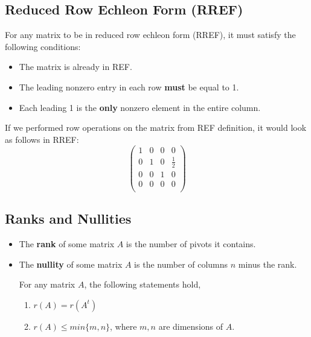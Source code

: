 \documentclass[a4paper]{article}
\begin{document}
  \subsection{Reduced Row Echleon Form (RREF)}\label{rref}
  For any matrix to be in reduced row echleon form (RREF), it must satisfy the following conditions:
  \begin{itemize}
    \item The matrix is already in REF.
    \item The leading nonzero entry in each row \textbf{must} be equal to 1.
    \item Each leading 1 is the \textbf{only} nonzero element in the entire column.
  \end{itemize}
  If we performed row operations on the matrix from REF definition, it would look as follows in RREF:
  \[
    \begin{pmatrix}
      1 & 0 & 0 & 0 \\  
      0 & 1 & 0 & \frac{1 }{2} \\  
      0 & 0 & 1 & 0 \\  
      0 & 0 & 0 & 0 \\  
    \end{pmatrix}
  \]
  \subsection{Ranks and Nullities}
  \begin{itemize}
    \item The \textbf{rank} of some matrix $A$ is the number of pivots it contains.
    \item The \textbf{nullity} of some matrix $A$ is the number of columns $n$ minus the rank.
  \begin{theorem}
    For any matrix $A$, the following statements hold,
    \begin{enumerate}
      \item $r(A) = r(A^t)$
      \item $r(A) \le min\{m,n\}$, where $m,n$ are dimensions of $A$.
    \end{enumerate}
  \end{theorem}
  
  \end{itemize}
  \newpage
\end{document}
